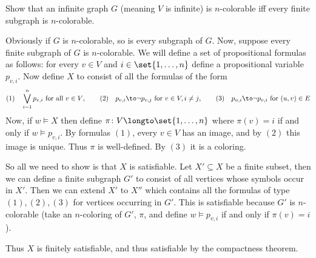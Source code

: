     Show that an infinite graph $G$ (meaning $V$ is infinite) is $n$-colorable iff every finite subgraph is $n$-colorable.

\eprob

Obviously if $G$ is $n$-colorable, so is every subgraph of $G$.
Now, suppose every finite subgraph of $G$ is $n$-colorable.
We will define a set of propositional formulas as follows: for every $v\in V$ and $i\in\set{1,\dots,n}$ define a propositional variable $p_{v,i}$.
Now define $X$ to consist of all the formulas of the form
$$ (1)\quad \bigvee_{i=1}^np_{v,i}\hbox{ for all $v\in V$},\qquad
(2)\quad p_{v,i}\to\neg p_{v,j}\hbox{ for $v\in V,i\neq j$},\qquad
(3)\quad p_{u,i}\to\neg p_{v,i}\hbox{ for $(u,v)\in E$} $$
Now, if $w\vDash X$ then define $\pi\colon V\longto\set{1,\dots,n}$ where $\pi(v)=i$ if and only if $w\vDash p_{v,i}$.
By formulas $(1)$, every $v\in V$ has an image, and by $(2)$ this image is unique.
Thus $\pi$ is well-defined.
By $(3)$ it is a coloring.

So all we need to show is that $X$ is satisfiable.
Let $X'\subseteq X$ be a finite subset, then we can define a finite subgraph $G'$ to consist of all vertices whose symbols occur in $X'$.
Then we can extend $X'$ to $X''$ which contains all the formulas of type $(1),(2),(3)$ for vertices occurring in $G'$.
This is satisfiable because $G'$ is $n$-colorable (take an $n$-coloring of $G'$, $\pi$, and define $w\vDash p_{v,i}$ if and only if $\pi(v)=i$).

Thus $X$ is finitely satisfiable, and thus satisfiable by the compactness theorem.

\bye
